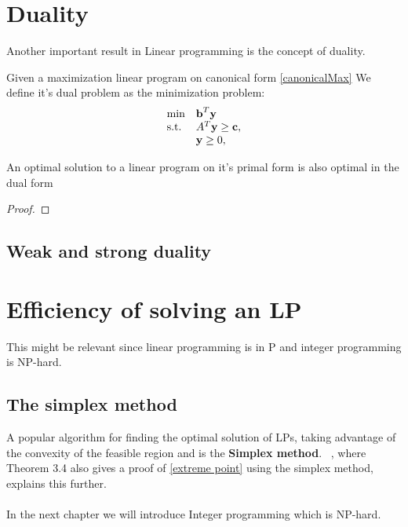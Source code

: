 \section{Duality}
Another important result in Linear programming is the concept of duality.
\begin{definition}
Given a maximization linear program on canonical form \ref{canonicalMax}
We define it's dual problem as the minimization problem:
\begin{align}\label{canonicalMaxDual}
\begin{array}{ll@{}ll}
\text{min} &\textbf{b}^T\textbf{y}&\\
\text{s.t.} &A^T\textbf{y} \geq \textbf{c},&\\
&\textbf{y} \geq 0,&\\
\end{array}
\end{align}
\end{definition}
\begin{theorem}
An optimal solution to a linear program on it's primal form is also optimal in the dual form
\begin{proof}
\end{proof}
\end{theorem}
\subsection{Weak and strong duality}
\section{Efficiency of solving an LP}
This might be relevant since linear programming is in P and integer programming is NP-hard.
\subsection{The simplex method}
A popular algorithm for finding the optimal solution of LPs, taking advantage of the convexity of the feasible region and  is the \textbf{Simplex method}. ~\cite{vanderbei2015linear}, where Theorem 3.4 also gives a proof of \ref{extreme point} using the simplex method, explains this further.
\\\\ In the next chapter we will introduce Integer programming which is NP-hard.